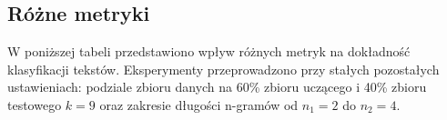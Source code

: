 \documentclass{article}
\begin{document}

\subsection{Różne metryki}
W poniższej tabeli przedstawiono wpływ różnych metryk na dokładność klasyfikacji tekstów. Eksperymenty przeprowadzono przy stałych pozostałych ustawieniach: podziale zbioru danych na 60\% zbioru uczącego i 40\% zbioru testowego \(k = 9\) oraz zakresie długości n-gramów od \(n_1 = 2\) do \(n_2 = 4\). \\
\end{document}
